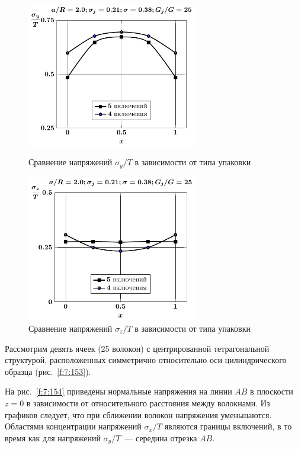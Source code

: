\begin{figure}[h!]
\centering\footnotesize
\parbox[b]{7.5cm}{\centering\includegraphics[width=7.4cm]{inc5-4-a20-g25-z0-sig_y.pdf}
\caption{Сравнение напряжений $\sigma_y/T$ в зависимости от типа упаковки
\label{f:7:144}}}\hfil\hfil
\parbox[b]{7.5cm}{\centering\includegraphics[width=7.4cm]{inc5-4-a20-g25-z0-sig_z.pdf}
\caption{Сравнение напряжений $\sigma_z/T$ в зависимости от типа упаковки
\label{f:7:145}}}
\end{figure}

Рассмотрим девять ячеек (25 волокон) с центрированной тетрагональной структурой, расположенных симметрично относительно оси цилиндрического образца (рис.~\ref{f:7:153}).

На рис.~\ref{f:7:154} приведены нормальные напряжения на линии $AB$ в плоскости $z=0$ в зависимости от относительного расстояния между волокнами. Из графиков следует, что при сближении волокон напряжения уменьшаются. Областями концентрации напряжений $\sigma_x/T$ являются границы включений, в то время как для напряжений $\sigma_y/T$~--- середина отрезка $AB$.


